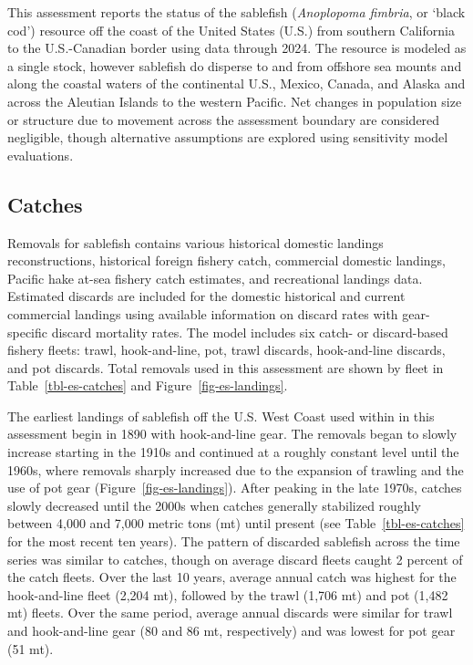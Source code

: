 \documentclass[
  english,
]{article}
\begin{document}
This assessment reports the status of the sablefish (\emph{Anoplopoma
fimbria}, or `black cod') resource off the coast of the United States
(U.S.) from southern California to the U.S.-Canadian border using data
through 2024. The resource is modeled as a single stock, however
sablefish do disperse to and from offshore sea mounts and along the
coastal waters of the continental U.S., Mexico, Canada, and Alaska and
across the Aleutian Islands to the western Pacific. Net changes in
population size or structure due to movement across the assessment
boundary are considered negligible, though alternative assumptions are
explored using sensitivity model evaluations.

\subsection*{Catches}\label{catches}

Removals for sablefish contains various historical domestic landings
reconstructions, historical foreign fishery catch, commercial domestic
landings, Pacific hake at-sea fishery catch estimates, and recreational
landings data. Estimated discards are included for the domestic
historical and current commercial landings using available information
on discard rates with gear-specific discard mortality rates. The model
includes six catch- or discard-based fishery fleets: trawl,
hook-and-line, pot, trawl discards, hook-and-line discards, and pot
discards. Total removals used in this assessment are shown by fleet in
Table~\ref{tbl-es-catches} and Figure~\ref{fig-es-landings}.

The earliest landings of sablefish off the U.S. West Coast used within
in this assessment begin in 1890 with hook-and-line gear. The removals
began to slowly increase starting in the 1910s and continued at a
roughly constant level until the 1960s, where removals sharply increased
due to the expansion of trawling and the use of pot gear
(Figure~\ref{fig-es-landings}). After peaking in the late 1970s, catches
slowly decreased until the 2000s when catches generally stabilized
roughly between 4,000 and 7,000 metric tons (mt) until present (see
Table~\ref{tbl-es-catches} for the most recent ten years). The pattern
of discarded sablefish across the time series was similar to catches,
though on average discard fleets caught 2 percent of the catch fleets.
Over the last 10 years, average annual catch was highest for the
hook-and-line fleet (2,204 mt), followed by the trawl (1,706 mt) and pot
(1,482 mt) fleets. Over the same period, average annual discards were
similar for trawl and hook-and-line gear (80 and 86 mt, respectively)
and was lowest for pot gear (51 mt).
\end{document}
